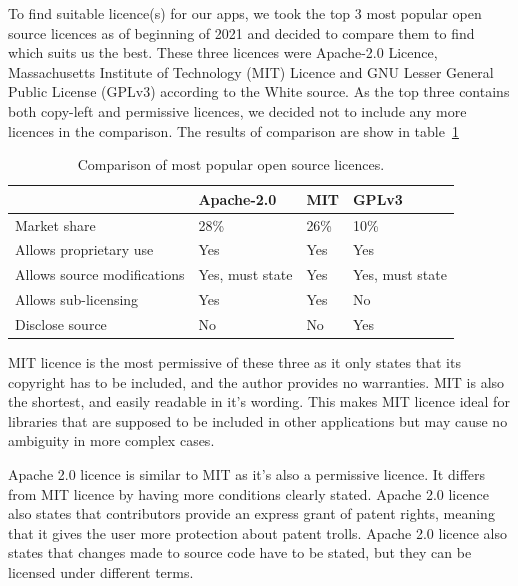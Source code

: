 To find suitable licence(s) for our apps, we took the top 3 most popular open source licences as of beginning of 2021 and decided
to compare them to find which suits us the best.
These three licences were Apache-2.0 Licence, Massachusetts Institute of Technology (MIT) Licence and GNU Lesser General Public License (GPLv3) according to the White source.
As the top three contains both copy-left and permissive licences, we decided not to include any more licences in the comparison.
\cite{open-source-licences}
The results of comparison are show in table~\ref{tab:open-source-licence-comparison}
\begin{table}[H]
    \centering
    \begin{tabular}{ | p{4cm} | p{2cm} | p{2cm} | p{2cm} |}
        \hline
         & \textbf{Apache-2.0} & \textbf{MIT} & \textbf{GPLv3}\\
        \hline
        Market share & 28\% & 26\% & 10\% \\
        \hline
        Allows proprietary use & Yes & Yes & Yes\\
        \hline
        Allows source modifications & Yes, must state & Yes & Yes, must state\\
        \hline
        Allows sub-licensing & Yes & Yes & No\\
        \hline
        Disclose source & No & No & Yes\\
        \hline
    \end{tabular}
    \caption{Comparison of most popular open source licences.}
    \label{tab:open-source-licence-comparison}
\end{table}

MIT licence is the most permissive of these three as it only states that its copyright has to be included, and
the author provides no warranties.
MIT is also the shortest, and easily readable in it's wording.
This makes MIT licence ideal for libraries that are supposed to be included in other applications but may cause
no ambiguity in more complex cases.
\cite{mit-licences}

Apache 2.0 licence is similar to MIT as it's also a permissive licence.
It differs from MIT licence by having more conditions clearly stated.
Apache 2.0 licence also states that contributors provide an express grant of patent rights, meaning that it gives
the user more protection about patent trolls.
Apache 2.0 licence also states that changes made to source code have to be stated, but they can be licensed under different terms.
\cite{apache-2-licences}

